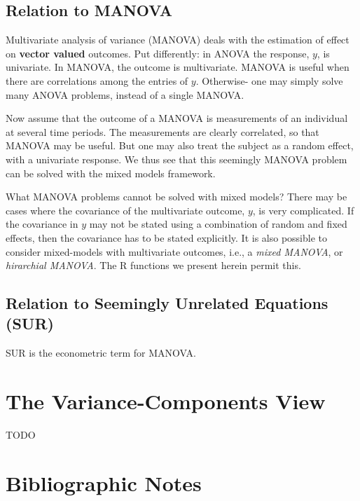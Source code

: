\documentclass[]{book}
\theoremstyle{definition}
\theoremstyle{definition}
\theoremstyle{definition}
\theoremstyle{remark}
\begin{document}
\subsection{Relation to MANOVA}\label{manova}

Multivariate analysis of variance (MANOVA) deals with the estimation of
effect on \textbf{vector valued} outcomes. Put differently: in ANOVA the
response, \(y\), is univariate. In MANOVA, the outcome is multivariate.
MANOVA is useful when there are correlations among the entries of \(y\).
Otherwise- one may simply solve many ANOVA problems, instead of a single
MANOVA.

Now assume that the outcome of a MANOVA is measurements of an individual
at several time periods. The measurements are clearly correlated, so
that MANOVA may be useful. But one may also treat the subject as a
random effect, with a univariate response. We thus see that this
seemingly MANOVA problem can be solved with the mixed models framework.

What MANOVA problems cannot be solved with mixed models? There may be
cases where the covariance of the multivariate outcome, \(y\), is very
complicated. If the covariance in \(y\) may not be stated using a
combination of random and fixed effects, then the covariance has to be
stated explicitly. It is also possible to consider mixed-models with
multivariate outcomes, i.e., a \emph{mixed MANOVA}, or \emph{hirarchial
MANOVA}. The R functions we present herein permit this.

\subsection{Relation to Seemingly Unrelated Equations
(SUR)}\label{relation-to-seemingly-unrelated-equations-sur}

SUR is the econometric term for MANOVA.

\section{The Variance-Components
View}\label{the-variance-components-view}

TODO

\section{Bibliographic Notes}\label{bibliographic-notes-6}
\end{document}
